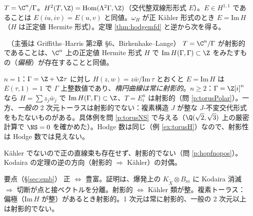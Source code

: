 \begin{ex}[複素トーラスは射影的か]\label{ex:torusproj}
$T=\C^n/\Gamma$。$H^2(T,\Z)=\mathrm{Hom}(\Lambda^2\Gamma,\Z)$（交代整双線形形式 $E$）。$E\in H^{1,1}$ であることは $E(iu,iv)=E(u,v)$ と同値。$\omega_H$ が正 Kähler 形式のとき $E=\mathrm{Im}\,H$（$H$ は正定値 Hermite 形式）。定理 \ref{thm:hodgemfd} と逆から次を得る。
\begin{thm}\tC\ （主張は Griffiths--Harris 第2章 \S6、Birkenhake--Lange）
$T=\C^n/\Gamma$ が射影的であることは、$\C^n$ 上の正定値 Hermite 形式 $H$ で $\mathrm{Im}\,H(\Gamma,\Gamma)\subset\Z$ をみたすもの（\emph{偏極}）が存在することと同値。
\end{thm}
$n=1$：$\Gamma=\Z+\Z\tau$ に対し $H(z,w)=z\bar w/\mathrm{Im}\,\tau$ とおくと $E=\mathrm{Im}\,H$ は $E(\tau,1)=1$ で $\Gamma$ 上整数値であり、\emph{楕円曲線は常に射影的}。$n\ge2$：$\Gamma=\Z[i]^n$ なら $H=\sum z_j\bar w_j$ で $\mathrm{Im}\,H(\Gamma,\Gamma)\subset\Z$、$T=E_i^n$ は射影的（問 \ref{p:torusPolar}）。一方、\emph{一般の} 2 次元トーラスは射影的でない：複素構造 $J$ が整な $J$-不変交代形式をもたないものがある。具体例を問 \ref{p:torusNS} で与える（$\Q(\sqrt2,\sqrt3)$ 上の厳密計算で $\NS=0$ を確かめた）。Hodge 数は同じ（例 \ref{ex:torusH}）なので、射影性は Hodge 数では見えない。
\end{ex}
\begin{ex}[Hopf 曲面]
Kähler でないので正の直線束も存在せず、射影的でない（問 \ref{p:hopfnopos}）。Kodaira の定理の逆の方向（射影的 $\Rightarrow$ Kähler）の対偶。
\end{ex}

\begin{keybox}{要点（\S\ref{sec:emb}）}
正 $\iff$ 豊富。証明は、爆発上の $K_{\tilde X}\otimes B_m$ に Kodaira 消滅 $\Rightarrow$ 切断が点と接ベクトルを分離。射影的 $\iff$ Kähler 類が整。複素トーラス：偏極（$\mathrm{Im}\,H$ が整）があるとき射影的。1 次元は常に射影的、一般の 2 次元以上は射影的でない。
\end{keybox}

